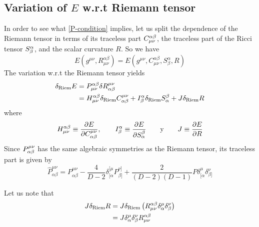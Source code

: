 \subsection{Variation of $E$ w.r.t Riemann tensor}
In order to see what \eqref{P-condition} implies, let us split the dependence of the Riemann tensor in terms of its traceless part $C_{\mu\nu }^{\alpha\beta }$, the traceless part of the Ricci tensor $S^\alpha_\beta $, and the scalar curvature $R$. So we have
\begin{equation*}
    E\left(g^{\mu\nu},R^{\alpha\beta}_{\mu\nu}\right)=E\left(g^{\mu\nu},C^{\alpha\beta}_{\mu\nu},S^\alpha_\beta,R\right)
\end{equation*}
The variation w.r.t the Riemann tensor yields
\begin{align}
    \nonumber\delta_{\rm Riem}E&=P^{\alpha\beta}_{\mu\nu}\delta R^{\mu\nu}_{\alpha\beta}\\
    &=H^{\alpha\beta}_{\mu\nu}\delta_{\rm Riem}C^{\mu\nu}_{\alpha\beta}+I^\alpha_\beta\delta_{\rm Riem}S^\beta_\alpha+J\delta_{\rm Riem}R\label{var R}
\end{align}
where
\begin{equation*}
    H^{\alpha\beta}_{\mu\nu}\equiv\pdv{E}{C^{\mu\nu}_{\alpha\beta}},\qquad I^\alpha_\beta\equiv \pdv{E}{S^\beta_\alpha}\qquad \text{y} \qquad  J\equiv\pdv{E}{R}
\end{equation*}
Since $P_{\alpha\beta }^{\mu\nu }$ has the same algebraic symmetries as the Riemann tensor, its traceless part is given by
\begin{equation}
    \hat{P}^{\mu\nu}_{\alpha\beta}=P^{\mu\nu}_{\alpha\beta}-\frac{4}{D-2}\delta^{[\mu}_{[\alpha}P^{\nu]}_{\beta]}+\frac{2}{(D-2)(D-1)}P\delta^\mu_{[\alpha}\delta^\nu_{\beta]}
\end{equation}




Let us note that
\begin{align}
   \nonumber J\delta_{\rm Riem}R&=J\delta_{\rm Riem}\left(R^{\alpha\beta}_{\mu\nu}\delta^\mu_\alpha\delta^\nu_\beta\right)\\
    &=J\delta^\mu_\alpha\delta^\nu_\beta R^{\alpha\beta}_{\mu\nu}\label{delta R}
\end{align}

